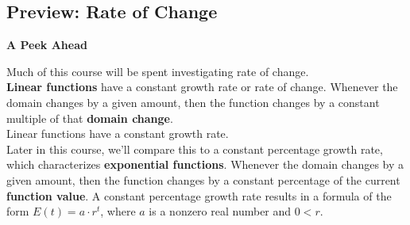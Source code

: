 \documentclass{ximera}
\begin{document}
\subsection*{Preview: Rate of Change}
\textbf{\textcolor{red!70!black}{A Peek Ahead}}


Much of this course will be spent investigating rate of change. \\

\textbf{Linear functions} have a constant growth rate or rate of change.  Whenever the domain changes by a given amount, then the function changes by a constant multiple of that \textbf{\textcolor{purple!85!blue}{domain change}}. \\

Linear functions have a constant growth rate.    \\





Later in this course, we'll compare this to a constant percentage growth rate, which characterizes \textbf{exponential functions}. Whenever the domain changes by a given amount, then the function changes by a constant percentage of the current \textbf{\textcolor{blue!55!black}{function value}}.  A constant percentage growth rate results in a formula of the form $E(t) = a \cdot r^t$, where $a$ is a nonzero real number and $0 < r$. \\
\end{document}
